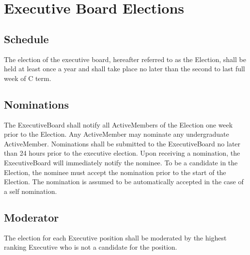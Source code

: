 \chapter{Executive Board Elections}\label{Bylaw:ExecutiveBoardElections}

\section{Schedule}\label{chap:ExecutiveBoardElectionsSchedule}
    The election of the executive board, hereafter referred to as the \gls{Election}, shall be held at least once a year and shall take place no later than the second to last full week of C term. 

\section{Nominations}\label{chap:ExecutiveBoardElectionsNominations}
    The \gls{ExecutiveBoard} shall notify all \glspl{ActiveMember} of the \gls{Election} one week prior to the \gls{Election}. Any \gls{ActiveMember} may nominate any undergraduate \gls{ActiveMember}. Nominations shall be submitted to the \gls{ExecutiveBoard} no later than 24 hours prior to the executive election. Upon receiving a nomination, the \gls{ExecutiveBoard} will immediately notify the nominee. To be a candidate in the \gls{Election}, the nominee must accept the nomination prior to the start of the \gls{Election}. The nomination is assumed to be automatically accepted in the case of a self nomination. 

\section{Moderator}\label{chap:ExecutiveBoardElectionsModerator}
    The election for each \gls{Executive} position shall be moderated by the highest ranking \gls{Executive} who is not a candidate for the position.

